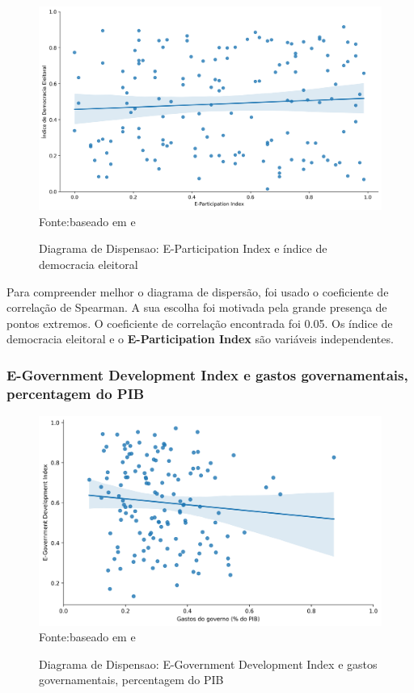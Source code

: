 \begin{figure}[H]
	\centering
	\caption{Diagrama de Dispensao: E-Participation Index e índice de democracia eleitoral}
	\includegraphics[width=1\linewidth]{figuras/egdi/dispersao_epart_indicedemocracia}
	\label{fig:dispersao_epart_indicedemocracia}
	\footnotesize{Fonte:baseado em \cite{ONU_EGDI_mapa} e \cite{electoral_democracy_index}}
\end{figure}

Para compreender melhor o diagrama de dispersão, foi usado o coeficiente de correlação de Spearman. A sua escolha foi motivada pela grande presença de pontos extremos. O coeficiente de correlação encontrada foi 0.05. Os índice de democracia eleitoral e o \textbf{E-Participation Index} são variáveis independentes.

\subsubsection{E-Government Development Index e gastos governamentais, percentagem do PIB}

\begin{figure}[H]
	\centering
	\caption{Diagrama de Dispensao: E-Government Development Index e gastos governamentais, percentagem do PIB}
	\includegraphics[width=1\linewidth]{figuras/egdi/dispersao_egov_govexpenditure}
	\label{fig:dispersao_egov_govexpenditure}
	\footnotesize{Fonte:baseado em \cite{ONU_EGDI_mapa} e \cite{FMI_gov_expenditure}}
\end{figure}

